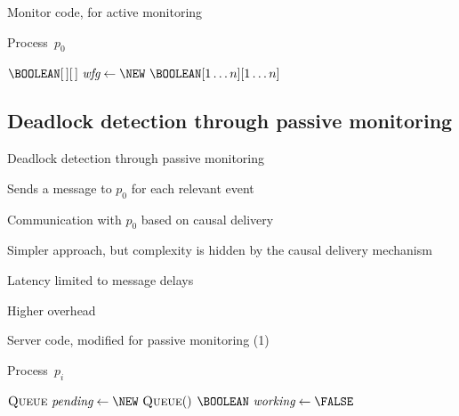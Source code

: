 \begin{frame}[shrink=16]{Monitor code, for active monitoring}
	
\vspace{-12pt}
\begin{Procedure}
\caption{Process\ $p_0$}
  $\BOOLEAN[\,][\,]\ \Wfg \gets \NEW\ \BOOLEAN[1 \ldots n][1 \ldots n]$\;
\end{Procedure}

\end{frame}

\subsection{Deadlock detection through passive monitoring}

\begin{frame}{Deadlock detection through passive monitoring}

\BI
\item Sends a message to $p_0$ for each relevant event
\item Communication with $p_0$ based on causal delivery
\EI

\bigskip
{}
\BI
\item Simpler approach, but complexity is hidden by the
  causal delivery mechanism
\item Latency limited to message delays
\item Higher overhead
\EI


\end{frame}


\begin{frame}[shrink=16]{Server code, modified for passive monitoring (1)}

\vspace{-12pt}
\begin{Procedure}
\caption{Process\ $p_i$}
  $\Queue\ \Pending \gets \NEW\ \Queue()$\;
  $\BOOLEAN\ \Working \gets \FALSE$\;
\end{Procedure}

\end{frame}

